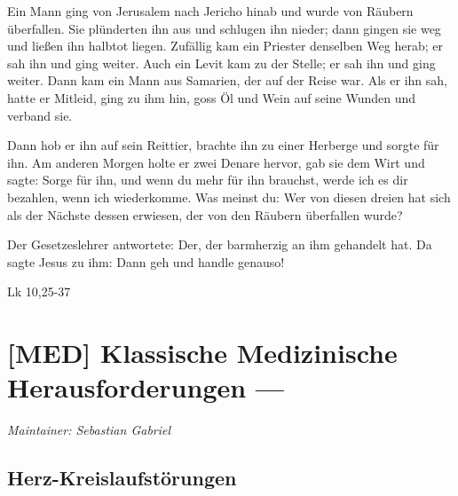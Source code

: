 \begin{savequote}
{\tiny Ein Mann ging von Jerusalem nach Jericho hinab und wurde von
Räubern überfallen. Sie plünderten ihn aus und schlugen ihn nieder; dann gingen sie weg und ließen ihn 
halbtot liegen. Zufällig kam ein Priester denselben Weg
herab; er sah ihn und ging weiter. Auch ein Levit kam zu
der  Stelle; er sah ihn und ging weiter. Dann kam ein Mann
aus  Samarien, der auf der Reise war. Als er ihn sah, hatte
er  Mitleid, ging zu ihm hin, goss Öl und Wein auf seine
Wunden  und verband sie. 

Dann hob er ihn auf sein Reittier,
brachte  ihn zu einer Herberge und sorgte für ihn. Am
anderen Morgen  holte er zwei Denare hervor, gab sie dem
Wirt und sagte:  Sorge für ihn, und wenn du mehr für ihn
brauchst, werde  ich es dir bezahlen, wenn ich wiederkomme.
Was meinst du:  Wer von diesen dreien hat sich als der
Nächste dessen erwiesen,  der von den Räubern überfallen
wurde?  

Der Gesetzeslehrer antwortete: Der, der
barmherzig an  ihm gehandelt hat. Da
sagte Jesus zu ihm: Dann geh und handle genauso!

Lk 10,25-37}
\end{savequote}

\chapter{[MED] Klassische Medizinische Herausforderungen ---}
\label{chp:MED}

\emph{Maintainer: Sebastian Gabriel}

\minitoc


% 
% 
% 




\clearpage
\section{Herz-Kreislaufstörungen}


\label{sec:herz-kreislauf-stoerungen}
\label{topic:herz-kreislauf-stoerungen}

